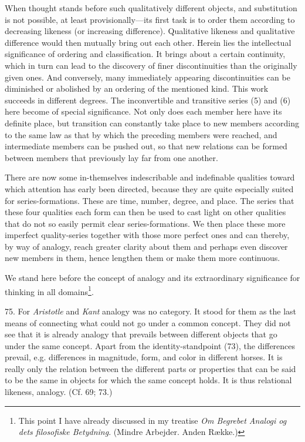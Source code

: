 \documentclass[12pt,a4paper]{book}
\newcommand{\opage}[1]{\marginnote{\footnotesize\textit{[#1]}}}
\begin{document}
When thought stands before such qualitatively different objects, and
substitution is not possible, at least provisionally---its first task is to
order them according to decreasing likeness (or increasing difference).
Qualitative likeness and qualitative difference would then mutually bring out
each other. Herein lies the intellectual significance of ordering and
classification. It brings about a certain continuity, which in turn can lead
to the discovery of finer discontinuities than the originally given ones. And
conversely, many immediately appearing discontinuities can be diminished or
abolished by an ordering of the mentioned kind. This work succeeds in
different degrees. The inconvertible and transitive series (5) and (6) here
become of special significance. Not only does each member here have its
definite place, but transition can constantly take place to new members
according to the same law as that by which the preceding members were
reached, and intermediate members can be pushed out, so that new relations
can be formed between members that previously lay far from one another.

There are now some in-themselves indescribable and indefinable qualities
toward which attention has early been directed, because they are quite
especially suited for series-formations. These are time, number, degree,
and place. The series that these four qualities each form can then be used to
cast light on other qualities that do not so easily permit clear
series-formations. We then place these more imperfect quality-\opage{182}series together
with those more perfect ones and can thereby, by way of analogy, reach
greater clarity about them and perhaps even discover new members in them,
hence lengthen them or make them more continuous.

We stand here before the concept of analogy and its extraordinary
significance for thinking in all domains\footnote{This point I have already
discussed in my treatise \emph{Om Begrebet Analogi og dets filosofiske
Betydning}. (Mindre Arbejder. Anden Række.)}.

75. For \emph{Aristotle} and \emph{Kant} analogy was no category. It stood
for them as the last means of connecting what could not go under a common
concept. They did not see that it is already analogy that prevails between
different objects that go under the same concept. Apart from the
identity-standpoint (73), the differences prevail, e.g. differences in
magnitude, form, and color in different horses. It is really only the
relation between the different parts or properties that can be said to be the
same in objects for which the same concept holds. It is thus
relational likeness, analogy. (Cf. 69; 73.)
\end{document}
